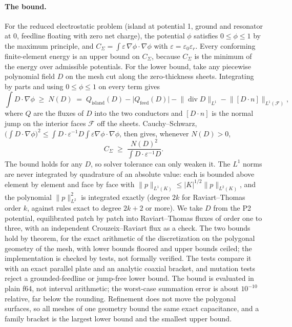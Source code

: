 \documentclass{anvil-paper}
\begin{document}
\paragraph{The bound.}
For the reduced electrostatic problem (island at potential 1, ground and
resonator at 0, feedline floating with zero net charge), the potential
$\phi$ satisfies $0 \le \phi \le 1$ by the maximum principle, and
$C_\Sigma = \int \varepsilon\,\nabla\phi\cdot\nabla\phi$ with $\varepsilon
= \varepsilon_0\varepsilon_r$. Every conforming finite-element energy is an
upper bound on $C_\Sigma$, because $C_\Sigma$ is the minimum of the energy
over admissible potentials. For the lower bound, take any piecewise
polynomial field $D$ on the mesh cut along the zero-thickness sheets.
Integrating by parts and using $0\le\phi\le1$ on every term gives
\begin{equation}
  \int D\cdot\nabla\phi \;\ge\; N(D) \;=\; Q_{\mathrm{island}}(D)
  - \lvert Q_{\mathrm{feed}}(D)\rvert
  - \lVert \operatorname{div} D\rVert_{L^1}
  - \lVert [D\cdot n]\rVert_{L^1(\mathcal F)},
  \label{eq:cert-n}
\end{equation}
where $Q$ are the fluxes of $D$ into the two conductors and
$[D\cdot n]$ is the normal jump on the interior faces $\mathcal F$ off
the sheets. Cauchy--Schwarz, $\bigl(\int D\cdot\nabla\phi\bigr)^2 \le
\int D\cdot\varepsilon^{-1}D \int\varepsilon\nabla\phi\cdot\nabla\phi$,
then gives, whenever $N(D) > 0$,
\begin{equation}
  C_\Sigma \;\ge\; \frac{N(D)^2}{\int D\cdot\varepsilon^{-1}D}.
  \label{eq:cert}
\end{equation}
The bound holds for any $D$, so solver tolerance can only weaken it. The
$L^1$ norms are never integrated by quadrature of an absolute value: each
is bounded above element by element and face by face with
$\lVert p\rVert_{L^1(K)} \le |K|^{1/2}\lVert p\rVert_{L^2(K)}$, and the
polynomial $\lVert p\rVert_{L^2}^2$ is integrated exactly (degree $2k$ for
Raviart--Thomas order $k$, against rules exact to degree $2k+2$ or more). We
take $D$ from the P2 potential, equilibrated patch by patch into
Raviart--Thomas fluxes of order one to three, with an independent
Crouzeix--Raviart flux as a check. The two bounds hold by theorem, for the
exact arithmetic of the discretization on the polygonal geometry of the
mesh, with lower bounds floored and upper bounds ceiled; the implementation
is checked by tests, not formally verified. The tests compare it with an
exact parallel plate and an analytic coaxial bracket, and mutation tests
reject a grounded-feedline or jump-free lower bound. The bound is evaluated
in plain f64, not interval arithmetic; the worst-case summation error is about
$10^{-10}$ relative, far below the rounding. Refinement does not move the
polygonal surfaces, so all meshes of one geometry bound the same exact
capacitance, and a family bracket is the largest lower bound and the
smallest upper bound.
\end{document}
